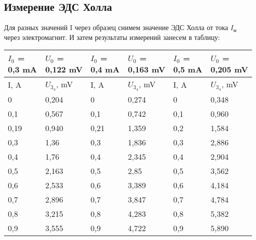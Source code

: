 \documentclass[a4paper, 12pt]{article}
\begin{document}
\subsection{Измерение ЭДС Холла}
Для разных значений I через образец снимем значение ЭДС Холла от тока $I_\text{м}$ через электромагнит. И затем результаты измерений занесем в таблицу:

\begin{center}
\begin{tabular}{|l|l|l|l|l|l|}
\hline
$I_0$ = 0,3 mA & $U_0$ = 0,122 mV & $I_0$ = 0,4 mA & $U_0$ = 0,163 mV & $I_0$ = 0,5 mA & $U_0$ = 0,205 mV \\ \hline
I, A           & $U_3_4$, mV      & I, A           & $U_3_4$, mV      & I, A           & $U_3_4$, mV      \\ \hline
0              & 0,204            & 0              & 0,274            & 0              & 0,348            \\ \hline
0,1            & 0,567            & 0,1            & 0,742            & 0,1            & 0,960            \\ \hline
0,19           & 0,940            & 0,21           & 1,359            & 0,2            & 1,584            \\ \hline
0,3            & 1,36             & 0,3            & 1,836            & 0,3            & 2,886            \\ \hline
0,4            & 1,76             & 0,4            & 2,345            & 0,4            & 2,904            \\ \hline
0,5            & 2,163            & 0,5            & 2,85             & 0,5            & 3,562            \\ \hline
0,6            & 2,533            & 0,6            & 3,389            & 0,6            & 4,184            \\ \hline
0,7            & 2,896            & 0,7            & 3,847            & 0,7            & 4,784            \\ \hline
0,8            & 3,215            & 0,8            & 4,283            & 0,8            & 5,382            \\ \hline
0,9            & 3,555            & 0,9            & 4,722            & 0,9            & 5,890            \\ \hline
\end{tabular}
\end{center}

\\
\end{document}
